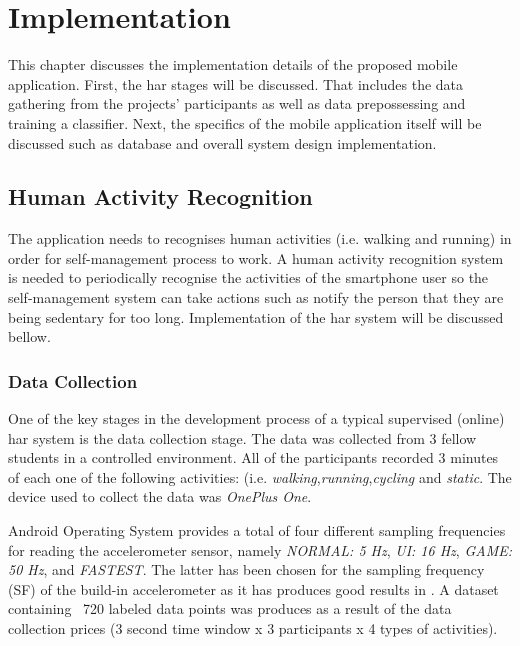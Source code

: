 \chapter{Implementation}
This chapter discusses the implementation details of the proposed mobile application. First, the \gls{har} stages will be discussed. That includes the data gathering from the projects' participants as well as data prepossessing and training a classifier. Next, the specifics of the mobile application itself will be discussed such as database and overall system design implementation.


\section{Human Activity Recognition}
The application needs to recognises human activities (i.e. walking and running) in order for self-management process to work. A human activity recognition system is needed to periodically recognise the activities of the smartphone user so the self-management system can take actions such as notify the person that they are being sedentary for too long. Implementation of the \gls{har} system will be discussed bellow.

    \subsection{Data Collection}
    One of the key stages in the development process of a typical supervised (online) \gls{har} system is the data collection stage. The data was collected from 3 fellow students in a controlled environment. All of the participants recorded 3 minutes of each one of the following activities: (i.e. \textit{walking},\textit{running},\textit{cycling} and \textit{static}. The device used to collect the data was \textit{OnePlus One}. 
    
    Android Operating System provides a total of four different sampling frequencies for reading the accelerometer sensor, namely \textit{NORMAL: 5 Hz}, \textit{UI: 16 Hz}, \textit{GAME: 50 Hz}, and \textit{FASTEST}. The latter has been chosen for the sampling frequency (SF) of the build-in accelerometer as it has produces good results in \citet[3-5]{lee2016}. A dataset containing ~720 labeled data points was produces as a result of the data collection prices (3 second time window x 3 participants x 4 types of activities).